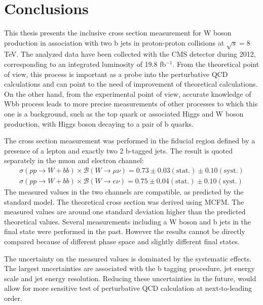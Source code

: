 
\chapter{Conclusions} %

\label{Chapter8} %


This thesis presents the inclusive cross section measurement for W boson production in association with two b jets in proton-proton collisions at $\sqrt{s}=$8 TeV. The analyzed data have been collected with the CMS detector during 2012, corresponding to an integrated luminosity of 19.8 fb$^{-1}$. From the theoretical point of view, this process is important as a probe into the perturbative QCD calculations and can point to the need of improvement of theoretical calculations. On the other hand, from the experimental  point of view, accurate  knowledge of Wbb process leads to more precise measurements of other processes to which this one is a background, such as the top quark or associated Higgs and W boson production, with Higgs boson  decaying to a pair of b quarks.

\par The cross section measurement was performed in the fiducial region defined by a presence of a lepton and exactly two 2 b-tagged jets. The result is quoted separately in the muon and electron channel: 
\begin{align*}
\sigma(pp\rightarrow W+bb)\times \mathcal{B}(W\rightarrow \mu\nu) = 0.73 \pm 0.03(\mathrm{stat.}) \pm 0.10(\mathrm{syst.})\\
\sigma(pp\rightarrow W+bb)\times \mathcal{B}(W\rightarrow e\nu) = 0.75 \pm 0.04(\mathrm{stat.}) \pm 0.10(\mathrm{syst.})
\end{align*}
The measured values in the two channels are compatible, as predicted by the standard model. The theoretical cross section was derived using MCFM. The measured values are around one standard deviation higher than the predicted theoretical values. Several measurements including a W boson and b jets in the final state were performed in the past. However the results cannot be directly compared because of different phase space and slightly different final states.

The uncertainty on the measured values is dominated by the systematic effects. The largest uncertainties are associated with the b tagging procedure, jet energy scale and jet energy resolution. Reducing these uncertainties in the future, would allow for more sensitive test of perturbative QCD calculation at next-to-leading order.

